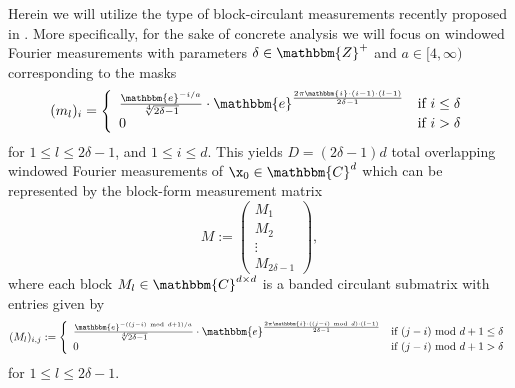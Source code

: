 Herein we will utilize the type of block-circulant measurements recently proposed
in \cite{IVW2015_FastPhase}.  More specifically, for the sake of
concrete analysis we will focus on windowed Fourier measurements with
parameters $\delta \in \mathbbm{Z}^+$ and $a \in [4, \infty)$
corresponding to the masks
%
\begin{equation}
(m_l)_{i} = \left\{ \begin{array}{ll}
    \frac{\mathbbm{e}^{-i/a}}{\sqrt[4]{2\delta -1}} \cdot
    \mathbbm{e}^{\frac{2 \pi \mathbbm{i} \cdot (i - 1) \cdot (l -1)}
    {2\delta - 1}} & \textrm{if}~i \leq \delta \\ 
    0 & \textrm{if}~i >  \delta\end{array} \right.
    \label{equ:MeasDef}
\end{equation}
%
for $1 \leq l \leq 2\delta - 1$, and $1 \leq i \leq d$.  This yields $D
= (2\delta - 1)d$ total overlapping windowed Fourier measurements of
$\x_0 \in \mathbbm{C}^d$ which can be represented by the block-form
measurement matrix
%
\begin{equation}
    M :=  \left( \begin{array}{l}  M_1\\ M_2\\ \vdots \\ M_{2\delta - 1}\end{array} \right),
    \label{equ:MblockDecomp}
\end{equation}
%
where each block $M_l \in \mathbbm{C}^{d \times d}$ is a banded
circulant submatrix with entries given by
%
\begin{equation*}
    (M_l)_{i,j} := \left\{ \begin{array}{ll} 
        \frac{\mathbbm{e}^{-((j-i)~{\rm mod}~d +1)/a}}{\sqrt[4]{2\delta -1}} \cdot 
                \mathbbm{e}^{\frac{2 \pi \mathbbm{i} \cdot 
                ((j-i)~{\rm mod}~d) \cdot (l - 1)}{2\delta - 1}} & 
                        \textrm{if}~(j-i)~{\rm mod}~d + 1 \leq \delta \\ 
        0 & \textrm{if}~(j-i)~{\rm mod}~d +1 > \delta\end{array} \right.
    \label{equ:SubMatDef}
\end{equation*}
%
for $1 \le l \le 2\delta - 1$.

